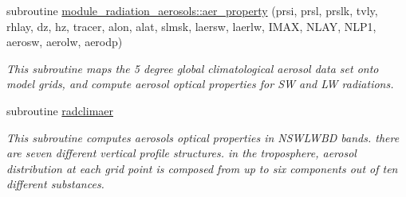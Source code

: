 \begin{DoxyCompactItemize}
\item 
subroutine \hyperlink{group__module__radiation__aerosols_ga494892c147b1e14ffb241e413bc17a8b}{module\+\_\+radiation\+\_\+aerosols\+::aer\+\_\+property} (prsi, prsl, prslk, tvly, rhlay, dz, hz, tracer, alon, alat, slmsk, laersw, laerlw, I\+M\+AX, N\+L\+AY, N\+L\+P1, aerosw, aerolw, aerodp)
\begin{DoxyCompactList}\small\item\em This subroutine maps the 5 degree global climatological aerosol data set onto model grids, and compute aerosol optical properties for SW and LW radiations. \end{DoxyCompactList}\item 
\mbox{\label{group__module__radiation__aerosols_gae60b55ebc37825b2c3c95f95b23ed558}} 
subroutine \hyperlink{group__module__radiation__aerosols_gae60b55ebc37825b2c3c95f95b23ed558}{radclimaer}
\begin{DoxyCompactList}\small\item\em This subroutine computes aerosols optical properties in N\+S\+W\+L\+W\+BD bands. there are seven different vertical profile structures. in the troposphere, aerosol distribution at each grid point is composed from up to six components out of ten different substances. \end{DoxyCompactList}\end{DoxyCompactItemize}
